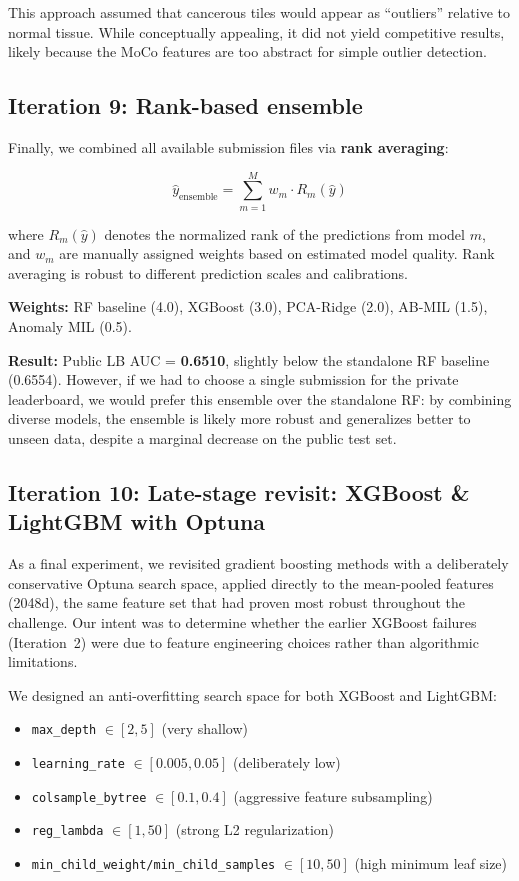 \documentclass[11pt,a4paper]{article}
\begin{document}
This approach assumed that cancerous tiles would appear as ``outliers'' relative to normal tissue. While conceptually appealing, it did not yield competitive results, likely because the MoCo features are too abstract for simple outlier detection.

\subsection{Iteration 9: Rank-based ensemble}

Finally, we combined all available submission files via \textbf{rank averaging}:

\begin{equation}
    \hat{y}_{\text{ensemble}} = \sum_{m=1}^{M} w_m \cdot R_m(\hat{y})
\end{equation}

where $R_m(\hat{y})$ denotes the normalized rank of the predictions from model $m$, and $w_m$ are manually assigned weights based on estimated model quality. Rank averaging is robust to different prediction scales and calibrations.

\textbf{Weights:} RF baseline (4.0), XGBoost (3.0), PCA-Ridge (2.0), AB-MIL (1.5), Anomaly MIL (0.5).

\textbf{Result:} Public LB AUC = \textbf{0.6510}, slightly below the standalone RF baseline (0.6554). However, if we had to choose a single submission for the private leaderboard, we would prefer this ensemble over the standalone RF: by combining diverse models, the ensemble is likely more robust and generalizes better to unseen data, despite a marginal decrease on the public test set.

\subsection{Iteration 10: Late-stage revisit: XGBoost \& LightGBM with Optuna}

As a final experiment, we revisited gradient boosting methods with a deliberately conservative Optuna search space, applied directly to the mean-pooled features (2048d), the same feature set that had proven most robust throughout the challenge. Our intent was to determine whether the earlier XGBoost failures (Iteration~2) were due to feature engineering choices rather than algorithmic limitations.

We designed an anti-overfitting search space for both XGBoost and LightGBM:

\begin{itemize}[nosep]
    \item \texttt{max\_depth} $\in [2, 5]$ (very shallow)
    \item \texttt{learning\_rate} $\in [0.005, 0.05]$ (deliberately low)
    \item \texttt{colsample\_bytree} $\in [0.1, 0.4]$ (aggressive feature subsampling)
    \item \texttt{reg\_lambda} $\in [1, 50]$ (strong L2 regularization)
    \item \texttt{min\_child\_weight/min\_child\_samples} $\in [10, 50]$ (high minimum leaf size)
\end{itemize}
\end{document}

